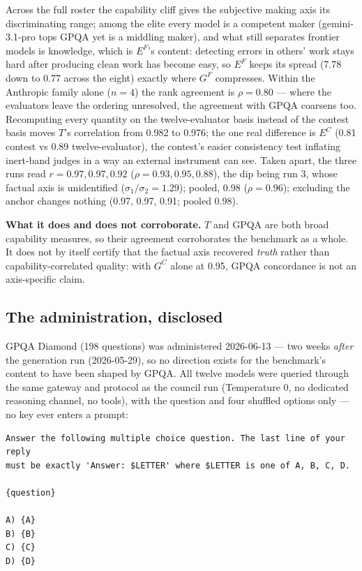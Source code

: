 \documentclass{article}
\begin{document}
Across the full roster the capability cliff gives the subjective making axis its discriminating range; among the elite every model is a competent maker (gemini-3.1-pro tops GPQA yet is a middling maker), and what still separates frontier models is knowledge, which is \(E^{F}\)'s content: detecting errors in others' work stays hard after producing clean work has become easy, so \(E^{F}\) keeps its spread (7.78 down to 0.77 across the eight) exactly where \(G^{F}\) compresses. Within the Anthropic family alone (\(n = 4\)) the rank agreement is \(\rho = 0.80\) --- where the evaluators leave the ordering unresolved, the agreement with GPQA coarsens too. Recomputing every quantity on the twelve-evaluator basis instead of the contest basis moves \(T\)'s correlation from 0.982 to 0.976; the one real difference is \(E^{C}\) (0.81 contest vs 0.89 twelve-evaluator), the contest's easier consistency test inflating inert-band judges in a way an external instrument can see. Taken apart, the three runs read \(r = 0.97, 0.97, 0.92\) (\(\rho = 0.93, 0.95, 0.88\)), the dip being run 3, whose factual axis is unidentified (\(\sigma_1/\sigma_2 = 1.29\)); pooled, 0.98 (\(\rho = 0.96\)); excluding the anchor changes nothing (0.97, 0.97, 0.91; pooled 0.98).

\textbf{What it does and does not corroborate.} \(T\) and GPQA are both broad capability measures, so their agreement corroborates the benchmark as a whole. It does not by itself certify that the factual axis recovered \emph{truth} rather than capability-correlated quality: with \(G^{C}\) alone at 0.95, GPQA concordance is not an axis-specific claim.

\subsection{The administration, disclosed}\label{the-administration-disclosed}

GPQA Diamond (198 questions) was administered 2026-06-13 --- two weeks \emph{after} the generation run (2026-05-29), so no direction exists for the benchmark's content to have been shaped by GPQA. All twelve models were queried through the same gateway and protocol as the council run (Temperature 0, no dedicated reasoning channel, no tools), with the question and four shuffled options only --- no key ever enters a prompt:

\begin{lstlisting}
Answer the following multiple choice question. The last line of your reply
must be exactly 'Answer: $LETTER' where $LETTER is one of A, B, C, D.

{question}

A) {A}
B) {B}
C) {C}
D) {D}
\end{lstlisting}
\end{document}
